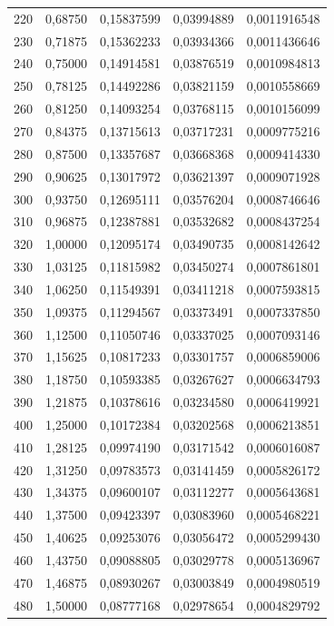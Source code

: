 \begin{longtable}{rrrrr}
220 & 0,68750 & 0,15837599 & 0,03994889 & 0,0011916548\\
230 & 0,71875 & 0,15362233 & 0,03934366 & 0,0011436646\\
240 & 0,75000 & 0,14914581 & 0,03876519 & 0,0010984813\\
250 & 0,78125 & 0,14492286 & 0,03821159 & 0,0010558669\\
260 & 0,81250 & 0,14093254 & 0,03768115 & 0,0010156099\\
270 & 0,84375 & 0,13715613 & 0,03717231 & 0,0009775216\\
280 & 0,87500 & 0,13357687 & 0,03668368 & 0,0009414330\\
290 & 0,90625 & 0,13017972 & 0,03621397 & 0,0009071928\\
300 & 0,93750 & 0,12695111 & 0,03576204 & 0,0008746646\\
310 & 0,96875 & 0,12387881 & 0,03532682 & 0,0008437254\\
320 & 1,00000 & 0,12095174 & 0,03490735 & 0,0008142642\\
330 & 1,03125 & 0,11815982 & 0,03450274 & 0,0007861801\\
340 & 1,06250 & 0,11549391 & 0,03411218 & 0,0007593815\\
350 & 1,09375 & 0,11294567 & 0,03373491 & 0,0007337850\\
360 & 1,12500 & 0,11050746 & 0,03337025 & 0,0007093146\\
370 & 1,15625 & 0,10817233 & 0,03301757 & 0,0006859006\\
380 & 1,18750 & 0,10593385 & 0,03267627 & 0,0006634793\\
390 & 1,21875 & 0,10378616 & 0,03234580 & 0,0006419921\\
400 & 1,25000 & 0,10172384 & 0,03202568 & 0,0006213851\\
410 & 1,28125 & 0,09974190 & 0,03171542 & 0,0006016087\\
420 & 1,31250 & 0,09783573 & 0,03141459 & 0,0005826172\\
430 & 1,34375 & 0,09600107 & 0,03112277 & 0,0005643681\\
440 & 1,37500 & 0,09423397 & 0,03083960 & 0,0005468221\\
450 & 1,40625 & 0,09253076 & 0,03056472 & 0,0005299430\\
460 & 1,43750 & 0,09088805 & 0,03029778 & 0,0005136967\\
470 & 1,46875 & 0,08930267 & 0,03003849 & 0,0004980519\\
480 & 1,50000 & 0,08777168 & 0,02978654 & 0,0004829792\\

\end{longtable}
